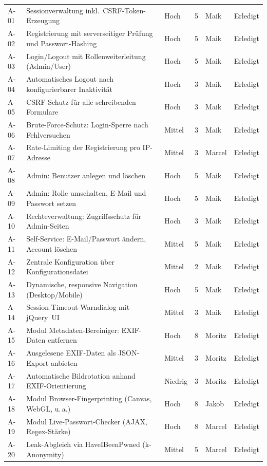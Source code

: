 \begin{small}
\begin{longtable}{@{}L{0.95cm} L{6.9cm} L{1.1cm} L{0.7cm} L{1.7cm} L{1.6cm}@{}}
A-01 & Sessionverwaltung inkl.\ CSRF-Token-Erzeugung & Hoch & 5 & Maik & Erledigt \\
A-02 & Registrierung mit serverseitiger Pr\"ufung und Passwort-Hashing & Hoch & 5 & Maik & Erledigt \\
A-03 & Login/Logout mit Rollenweiterleitung (Admin/User) & Hoch & 5 & Maik & Erledigt \\
A-04 & Automatisches Logout nach konfigurierbarer Inaktivit\"at & Hoch & 3 & Maik & Erledigt \\
A-05 & CSRF-Schutz f\"ur alle schreibenden Formulare & Hoch & 3 & Maik & Erledigt \\
A-06 & Brute-Force-Schutz: Login-Sperre nach Fehlversuchen & Mittel & 3 & Maik & Erledigt \\
A-07 & Rate-Limiting der Registrierung pro IP-Adresse & Mittel & 3 & Marcel & Erledigt \\
A-08 & Admin: Benutzer anlegen und l\"oschen & Hoch & 5 & Maik & Erledigt \\
A-09 & Admin: Rolle umschalten, E-Mail und Passwort setzen & Hoch & 5 & Maik & Erledigt \\
A-10 & Rechteverwaltung: Zugriffsschutz f\"ur Admin-Seiten & Hoch & 3 & Maik & Erledigt \\
A-11 & Self-Service: E-Mail/Passwort \"andern, Account l\"oschen & Mittel & 5 & Maik & Erledigt \\
A-12 & Zentrale Konfiguration \"uber Konfigurationsdatei & Mittel & 2 & Maik & Erledigt \\
A-13 & Dynamische, responsive Navigation (Desktop/Mobile) & Hoch & 5 & Maik & Erledigt \\
A-14 & Session-Timeout-Warndialog mit jQuery~UI & Mittel & 3 & Maik & Erledigt \\
A-15 & Modul Metadaten-Bereiniger: EXIF-Daten entfernen & Hoch & 8 & Moritz & Erledigt \\
A-16 & Ausgelesene EXIF-Daten als JSON-Export anbieten & Mittel & 3 & Moritz & Erledigt \\
A-17 & Automatische Bildrotation anhand EXIF-Orientierung & Niedrig & 3 & Moritz & Erledigt \\
A-18 & Modul Browser-Fingerprinting (Canvas, WebGL, u.\,a.) & Hoch & 8 & Jakob & Erledigt \\
A-19 & Modul Live-Passwort-Checker (AJAX, Regex-St\"arke) & Hoch & 8 & Marcel & Erledigt \\
A-20 & Leak-Abgleich via HaveIBeenPwned (k-Anonymity) & Mittel & 5 & Marcel & Erledigt \\

\end{longtable}
\end{small}

